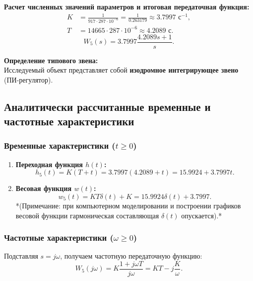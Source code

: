 \documentclass[12pt, a4paper]{article}
\begin{document}
\textbf{Расчет численных значений параметров и итоговая передаточная функция:}
\begin{align*}
    K &= \frac{1}{917 \cdot 287 \cdot 10^{-6}} = \frac{1}{0.263179} \approx 3.7997 \text{ с}^{-1}, \\
    T &= 14665 \cdot 287 \cdot 10^{-6} \approx 4.2089 \text{ с}.
\end{align*}
\begin{equation}
    W_5(s) = 3.7997 \frac{4.2089s + 1}{s}.
\end{equation}

\textbf{Определение типового звена:} \\
Исследуемый объект представляет собой \textbf{изодромное интегрирующее звено} (ПИ-регулятор).

\subsection{Аналитически рассчитанные временные и частотные характеристики}

\subsubsection{Временные характеристики ($t \ge 0$)}

\begin{enumerate}
    \item \textbf{Переходная функция $h(t)$:}
    \begin{equation}
        h_5(t) = K(T + t) = 3.7997(4.2089 + t) = 15.9924 + 3.7997t.
    \end{equation}

    \item \textbf{Весовая функция $w(t)$:}
    \begin{equation}
        w_5(t) = KT\delta(t) + K = 15.9924\delta(t) + 3.7997.
    \end{equation}
    *(Примечание: при компьютерном моделировании и построении графиков весовой функции гармоническая составляющая $\delta(t)$ опускается).*
\end{enumerate}

\subsubsection{Частотные характеристики ($\omega \ge 0$)}

Подставляя $s = j\omega$, получаем частотную передаточную функцию:
\begin{equation*}
    W_5(j\omega) = K \frac{1 + j\omega T}{j\omega} = KT - j\frac{K}{\omega}.
\end{equation*}
\end{document}
